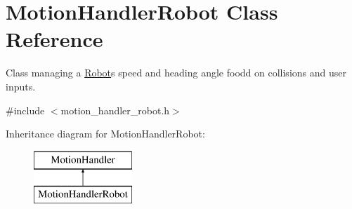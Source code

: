 \hypertarget{class_motion_handler_robot}{}\section{Motion\+Handler\+Robot Class Reference}
\label{class_motion_handler_robot}


Class managing a \mbox{\hyperlink{class_robot}{Robot}}\textquotesingle{}s speed and heading angle foodd on collisions and user inputs.  




{\ttfamily \#include $<$motion\+\_\+handler\+\_\+robot.\+h$>$}

Inheritance diagram for Motion\+Handler\+Robot\+:\begin{figure}[H]
\begin{center}
\leavevmode
\includegraphics[height=2.000000cm]{class_motion_handler_robot}
\end{center}
\end{figure}

